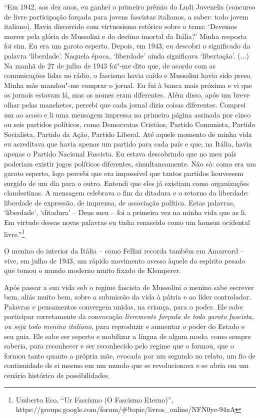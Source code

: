 ``Em 1942, aos dez anos, eu ganhei o primeiro prêmio do Ludi Juvenelis
(concurso de livre participação forçada para jovens fascistas italianos,
a saber: todo jovem italiano). Havia discorrido com virtuosismo retórico
sobre o tema: `Devemos morrer pela glória de Mussolini e do destino
imortal da Itália?' Minha resposta foi sim. Eu era um garoto esperto.
Depois, em 1943, eu descobri o significado da palavra `liberdade'.
Naquela época, `liberdade' ainda significava `libertação'. (...) Na
manhã de 27 de julho de 1943 foi"-me dito que, de acordo com as
comunicações lidas no rádio, o fascismo havia caído e Mussolini havia
sido preso. Minha mãe mandou"-me comprar o jornal. Eu fui à banca mais
próxima e vi que os jornais estavam lá, mas os nomes eram diferentes.
Além disso, após um breve olhar pelas manchetes, percebi que cada jornal
dizia coisas diferentes. Comprei um ao acaso e li uma mensagem impressa
na primeira página assinada por cinco ou seis partidos políticos, como
Democratas Cristãos, Partido Comunista, Partido Socialista, Partido da
Ação, Partido Liberal. Até aquele momento de minha vida eu acreditava
que havia apenas um partido para cada país e que, na Itália, havia
apenas o Partido Nacional Fascista. Eu estava descobrindo que no meu
país poderiam existir jogos políticos diferentes, simultaneamente. Não
só: como era um garoto esperto, logo percebi que era impossível que
tantos partidos houvessem surgido de um dia para o outro. Entendi que
eles já existiam como organizações clandestinas. A mensagem celebrava o
fim da ditadura e o retorno da liberdade: liberdade de expressão, de
imprensa, de associação política. Estas palavras, `liberdade',
`ditadura' -- Deus meu -- foi a primeira vez na minha vida que as li. Em
virtude dessas novas palavras eu tinha renascido como um homem ocidental
livre.''\footnote{Umberto Eco, ``Ur Fascismo (O Fascismo Eterno)'',
  https://groups.google.com/forum/\#!topic/livros\_online/NFN0ye-94xA}

O menino do interior da Itália -- como Fellini recorda também em
Amarcord -- vive, em julho de 1943, um rápido movimento avesso àquele do
espírito pesado que tomou o mundo moderno muito fixado de Klemperer.

Após passar a sua vida sob o regime fascista de Mussolini o menino sabe
escrever bem, aliás muito bem, sobre a submissão da vida à pátria e ao
líder controlador. Palavras e pensamentos convergem unidas, na criança,
para o poder. Ele sabe participar corretamente da convocação
\emph{livremente forçada de todo garoto fascista, ou seja todo menino
italiano}, para reproduzir e aumentar o poder do Estado e seu guia. Ele
sabe ser esperto e mobilizar a língua de algum modo, como sempre
saberia, para reconhecer e ser reconhecido pelo regime que o formou, que
o formou tanto quanto a própria mãe, evocada por um segundo no relato,
um fio de continuidade de si mesmo em um mundo que se revolucionava e se
abria em um cenário histórico de possibilidades.

